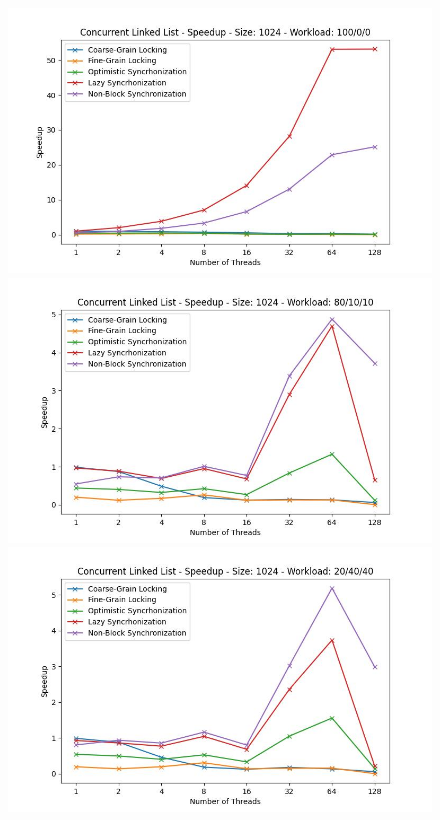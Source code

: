 \documentclass[../final_report.tex]{subfiles}
\begin{document}
\begin{figure}[H]
    \centering
        \includegraphics[scale=0.4]{outFiles/plots/concurrent_data_structs_all_speedup_1024_100_0_0.jpg}
        \includegraphics[scale=0.4]{outFiles/plots/concurrent_data_structs_all_speedup_1024_80_10_10.jpg}
        \includegraphics[scale=0.4]{outFiles/plots/concurrent_data_structs_all_speedup_1024_20_40_40.jpg}

\end{figure}
\end{document}
